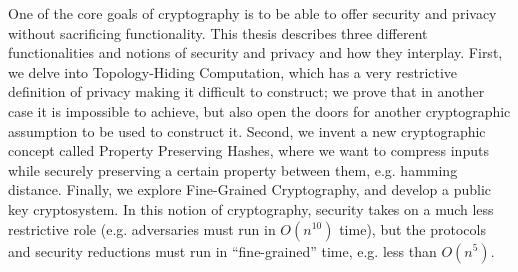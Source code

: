 % 
% 
%
One of the core goals of cryptography is to be able to offer security and privacy without sacrificing functionality. This thesis describes three different functionalities and notions of security and privacy and how they interplay. First, we delve into Topology-Hiding Computation, which has a very restrictive definition of privacy making it difficult to construct; we prove that in another case it is impossible to achieve, but also open the doors for another cryptographic assumption to be used to construct it. Second, we invent a new cryptographic concept called Property Preserving Hashes, where we want to compress inputs while securely preserving a certain property between them, e.g. hamming distance. Finally, we explore Fine-Grained Cryptography, and develop a public key cryptosystem. In this notion of cryptography, security takes on a much less restrictive role (e.g. adversaries must run in $O(n^{10})$ time), but the protocols and security reductions must run in ``fine-grained'' time, e.g. less than $O(n^5)$.
